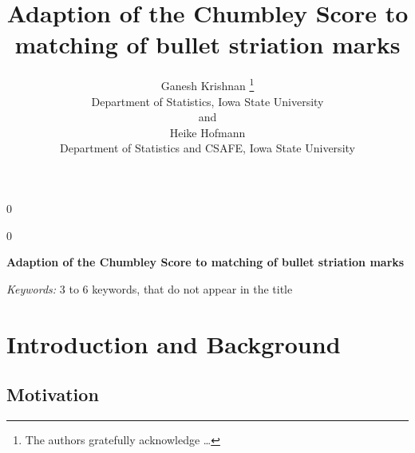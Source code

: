 \documentclass[12pt]{article}
\newcommand{\blind}{0}
\begin{document}
\def\spacingset#1{\renewcommand{\baselinestretch}%
{#1}\small\normalsize} \spacingset{1}



\blind
{
  \title{\bf Adaption of the Chumbley Score to matching of bullet striation marks}

  \author{
        Ganesh Krishnan \thanks{The authors gratefully acknowledge \ldots{}} \\
    Department of Statistics, Iowa State University\\
     and \\     Heike Hofmann \\
    Department of Statistics and CSAFE, Iowa State University\\
      }
  \maketitle
} \fi

\blind
{
  \bigskip
  \bigskip
  \bigskip
  \begin{center}
    {\LARGE\bf Adaption of the Chumbley Score to matching of bullet striation marks}
  \end{center}
  \medskip
} \fi

\bigskip
\begin{abstract}

\end{abstract}

\noindent%
{\it Keywords:} 3 to 6 keywords, that do not appear in the title
\vfill

\newpage
\spacingset{1.45} %

\newcommand{\hh}[1]{{\textcolor{orange}{#1}}}
\newcommand{\gk}[1]{{\textcolor{green}{#1}}}
\newcommand{\cited}[1]{{\textcolor{red}{#1}}}

\tableofcontents
\newpage

\section{Introduction and Background}\label{introduction-and-background}

\subsection{Motivation}\label{motivation}
\end{document}
